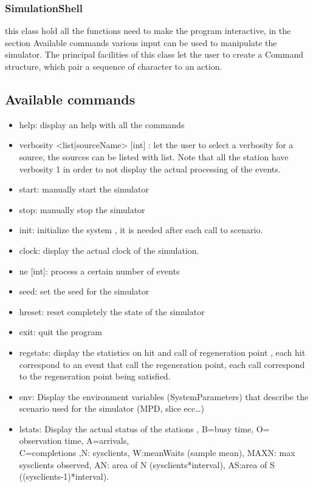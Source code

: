 \documentclass[12pt,a4paper]{article}
\begin{document}
\subsubsection{SimulationShell}
this class hold all the functions need to make the program interactive, in the section Available commands various input can be used to manipulate the simulator. The principal facilities of this class let the user to create a Command structure, which pair a sequence of character to an action.
\subsection{Available commands}
\begin{itemize}
    \item help: display an help with all the commands
    \item verbosity <list|sourceName> [int] : let the user to select a verbosity for a source, the sources can be listed with list. Note that all the station have verbosity 1 in order to not display the actual processing of the events.
    \item start: manually start the simulator
    \item stop: manually stop the simulator
    \item init: initialize the system , it is needed after each call to scenario.
    \item clock: display the actual clock of the simulation.
    \item ne [int]: process a certain number of events
    \item seed: set the seed for the simulator
    \item hreset: reset completely the state of the simulator
    \item exit: quit the program
    \item regstats: display the statistics on hit and call of regeneration point , each hit correspond to an event that call the regeneration point, each call correspond to the regeneration point being satisfied.
    \item env: Display the environment variables (SystemParameters) that describe the scenario used for the simulator (MPD, slice ecc\dots)
    \item lstats: Display the actual status of the stations , B=busy time, O= observation time, A=arrivals,\\C=completions ,N: sysclients, W:meanWaits (sample mean), MAXN: max sysclients observed, AN: area of N (sysclients*interval), AS:area of S ((sysclients-1)*interval).

\end{itemize}
\end{document}
